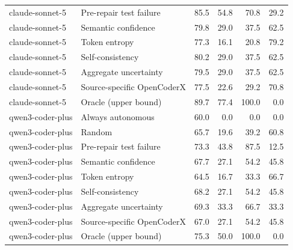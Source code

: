 \begin{table}[t]
\begin{tabular}{llrrrr}
claude-sonnet-5 & Pre-repair test failure & 85.5 & 54.8 & 70.8 & 29.2 \\
claude-sonnet-5 & Semantic confidence & 79.8 & 29.0 & 37.5 & 62.5 \\
claude-sonnet-5 & Token entropy & 77.3 & 16.1 & 20.8 & 79.2 \\
claude-sonnet-5 & Self-consistency & 80.2 & 29.0 & 37.5 & 62.5 \\
claude-sonnet-5 & Aggregate uncertainty & 79.5 & 29.0 & 37.5 & 62.5 \\
claude-sonnet-5 & Source-specific OpenCoderX & 77.5 & 22.6 & 29.2 & 70.8 \\
claude-sonnet-5 & Oracle (upper bound) & 89.7 & 77.4 & 100.0 & 0.0 \\
\midrule
qwen3-coder-plus & Always autonomous & 60.0 & 0.0 & 0.0 & 0.0 \\
qwen3-coder-plus & Random & 65.7 & 19.6 & 39.2 & 60.8 \\
qwen3-coder-plus & Pre-repair test failure & 73.3 & 43.8 & 87.5 & 12.5 \\
qwen3-coder-plus & Semantic confidence & 67.7 & 27.1 & 54.2 & 45.8 \\
qwen3-coder-plus & Token entropy & 64.5 & 16.7 & 33.3 & 66.7 \\
qwen3-coder-plus & Self-consistency & 68.2 & 27.1 & 54.2 & 45.8 \\
qwen3-coder-plus & Aggregate uncertainty & 69.3 & 33.3 & 66.7 & 33.3 \\
qwen3-coder-plus & Source-specific OpenCoderX & 67.0 & 27.1 & 54.2 & 45.8 \\
qwen3-coder-plus & Oracle (upper bound) & 75.3 & 50.0 & 100.0 & 0.0 \\
\bottomrule
\end{tabular}
\end{table}
